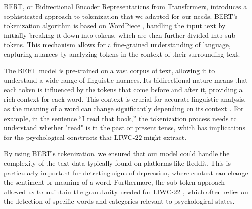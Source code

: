 BERT, or Bidirectional Encoder Representations from Transformers, introduces a sophisticated approach to tokenization that we adapted for our needs. BERT’s tokenization algorithm is based on WordPiece \cite{wu2016google}, handling the input text by initially breaking it down into tokens, which are then further divided into sub-tokens. This mechanism allows for a fine-grained understanding of language, capturing nuances by analyzing tokens in the context of their surrounding text.

The BERT model is pre-trained on a vast corpus of text, allowing it to understand a wide range of linguistic nuances. Its bidirectional nature means that each token is influenced by the tokens that come before and after it, providing a rich context for each word. This context is crucial for accurate linguistic analysis, as the meaning of a word can change significantly depending on its context \cite{bertTokenizerEnglish}. For example, in the sentence “I read that book,” the tokenization process needs to understand whether "read" is in the past or present tense, which has implications for the psychological constructs that LIWC-22 might extract.

By using BERT's tokenization, we ensured that our model could handle the complexity of the text data typically found on platforms like Reddit. This is particularly important for detecting signs of depression, where context can change the sentiment or meaning of a word. Furthermore, the sub-token approach allowed us to maintain the granularity needed for LIWC-22 \cite{boyd2022development}, which often relies on the detection of specific words and categories relevant to psychological states.









